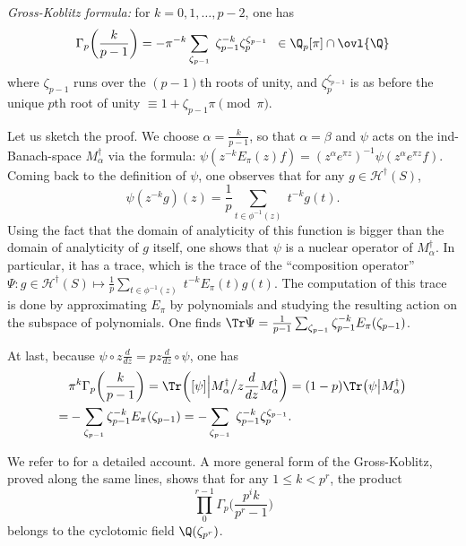 \begin{para}\label{para-gross-koblitz}
 {\itshape Gross-Koblitz formula:}
 for $k=0,1,\ldots,p-2$, one has
 \begin{equation*}
  \Gamma_p\biggl(\frac{k}{p-1}\biggr)=-\pi^{-k}\sum_{\zeta_{p-1}}\;
   \zeta_{p-1}^{-k}\zeta_p^{\zeta_{p-1}}\;\;\in \Q_p[\pi]\cap
   {\ovl{\Q}}
 \end{equation*}
 where $\zeta_{p-1}$ runs over the $(p-1)$th roots of unity,
 and $\zeta_p^{\zeta_{p-1}}$ is as before the unique $p$th root of 
 unity $\equiv 1+\zeta_{p-1}\pi \pmod{\pi}$.

 \medskip
 Let us sketch the proof.  We choose $\alpha=\frac{k}{p-1}$, so that
 $\alpha=\beta$ and $\psi$ acts on the ind-Banach-space
 $M_\alpha^{\dagger}$ via the formula:
 $\psi(z^{-k}E_{\pi}(z)f) =
 (z^{\alpha}e^{\pi z})^{-1}\psi(z^{\alpha}e^{\pi z}f)$.
 Coming back to the definition of $\psi$, one observes that for any
 $g\in \mathcal{H}^{\dagger}(S)$, 
 \begin{equation*}
  \psi(z^{-k}g)(z)= \frac{1}{p}\sum_{t\in \phi^{-1}(z)}\;t^{-k}g(t).
 \end{equation*}
 Using the fact that the domain of analyticity of this function is 
 bigger than the domain of analyticity of $g$ itself, one shows that
 $\psi$ is a nuclear operator of $M_\alpha^{\dagger}$. In particular, it
 has a trace, which is the trace of the ``composition operator''
 $\Psi: g\in \mathcal{H}^{\dagger}(S)\mapsto \frac{1}{p}
 \sum_{t\in \phi^{-1}(z)}\;t^{-k}E_\pi(t)g(t)$.
 The computation of this trace is done by approximating $E_\pi$ by
 polynomials and studying the resulting action on the subspace of
 polynomials.  One finds $\Tr\Psi = \frac{1}{p-1}\sum_{\zeta_{p-1}}
 \zeta_{p-1}^{-k}E_\pi(\zeta_{p-1})$.

 At last, because $\psi \circ z\frac{d}{dz}= pz\frac{d}{dz}\circ\psi$,
 one has
 \begin{align*}
  & \pi^k\Gamma_p\biggl(\frac{k}{p-1}\biggr) =
 \Tr\biggl([\psi] \Big|
  M_{\alpha}^{\dag}\big/z\frac{d}{dz}M_\alpha^{\dag}\biggr)
 =(1-p)\Tr\bigl(\psi\big|{M_\alpha^{\dagger}}\bigr)\\
 = & -\sum_{\zeta_{p-1}}\zeta_{p-1}^{-k}E_\pi(\zeta_{p-1})
 = -\sum_{\zeta_{p-1}}\;\zeta_{p-1}^{-k}\zeta_p^{\zeta_{p-1}}.
 \end{align*}

 We refer to \cite{edpaase} for a detailed account. A more general form of the Gross-Koblitz,
proved along the same lines, shows that for any $1\leq k < p^r$, the product 
\begin{equation*}
  \prod_0^{r-1} \Gamma_p\biggl(\frac{p^i k}{p^r-1}\biggr)
 \end{equation*}
belongs to the cyclotomic field $\Q(\zeta_{p^r})$.
  
\end{para}
